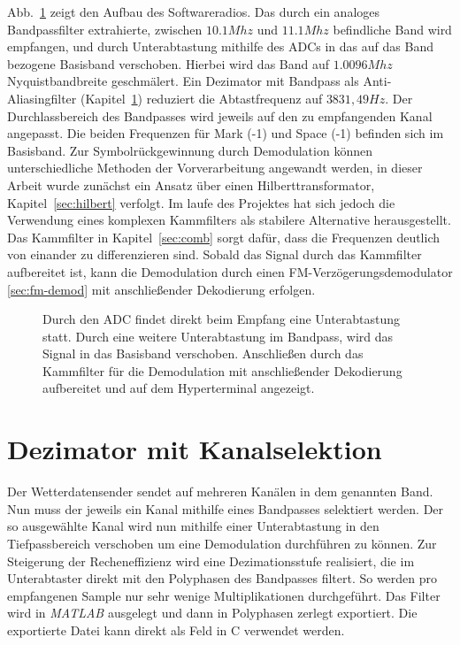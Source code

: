 \documentclass{article}
\begin{document}
Abb.~\ref{fig:signal} zeigt den Aufbau des Softwareradios. Das durch ein analoges Bandpassfilter extrahierte, zwischen $10.1Mhz$ und $11.1Mhz$ befindliche Band wird empfangen, und durch Unterabtastung mithilfe des ADCs in das auf das Band bezogene Basisband verschoben.
Hierbei wird das Band auf $1.0096Mhz$ Nyquistbandbreite geschmälert. Ein Dezimator mit Bandpass als Anti-Aliasingfilter (Kapitel~\ref{sec:FIR}) reduziert die Abtastfrequenz auf $3831,49Hz$. Der Durchlassbereich des Bandpasses wird jeweils auf den zu empfangenden Kanal angepasst. Die beiden Frequenzen für Mark (-1) und Space (-1) befinden sich im Basisband. Zur Symbolrückgewinnung durch Demodulation können unterschiedliche Methoden der Vorverarbeitung angewandt werden, in dieser Arbeit wurde zunächst ein Ansatz über einen Hilberttransformator, Kapitel~\ref{sec:hilbert} verfolgt. Im laufe des Projektes hat sich jedoch die Verwendung eines komplexen Kammfilters
als stabilere Alternative herausgestellt. Das Kammfilter in Kapitel~\ref{sec:comb} sorgt dafür, dass die Frequenzen deutlich von einander zu differenzieren sind. Sobald das Signal durch das Kammfilter
aufbereitet ist, kann die Demodulation durch einen FM-Verzögerungsdemodulator \ref{sec:fm-demod} mit anschließender Dekodierung erfolgen.


\begin{figure}[!h]
    \centering
    \def\svgscale{0.5}
    \def\svgwidth{\columnwidth}
    
    \caption{Durch den ADC findet direkt beim Empfang eine Unterabtastung statt. Durch eine weitere Unterabtastung im Bandpass, wird das Signal in das Basisband verschoben.
    Anschließen durch das Kammfilter für die Demodulation mit anschließender Dekodierung aufbereitet und auf dem Hyperterminal angezeigt.}
    \label{fig:signal}
\end{figure}

\section{Dezimator mit Kanalselektion}\label{sec:FIR}
Der Wetterdatensender sendet auf mehreren Kanälen in dem genannten Band. Nun muss der jeweils ein Kanal mithilfe eines Bandpasses selektiert werden. Der so ausgewählte Kanal wird nun mithilfe einer Unterabtastung in den Tiefpassbereich verschoben um eine Demodulation durchführen zu können. Zur Steigerung der Recheneffizienz wird eine Dezimationsstufe realisiert, die im Unterabtaster direkt mit den Polyphasen des Bandpasses filtert. So werden pro empfangenen Sample nur sehr wenige Multiplikationen durchgeführt. Das Filter wird in \textit{MATLAB} ausgelegt und dann in Polyphasen zerlegt exportiert. Die exportierte Datei kann direkt als Feld in C verwendet werden.
\end{document}
